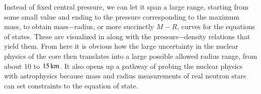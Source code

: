 Instead of fixed central pressure, we can let it span a large range, starting from some small value and ending to the pressure corresponding to the maximum mass, to obtain mass$-$radius, or more succinctly $M-R$, curves for the equations of states.
These are visualized in  along with the pressure$-$density relations that yield them.
From here it is obvious how the large uncertainty in the nuclear physics of the core then translates into a large possible allowed radius range, from about $10$ to $15\, \mathrm{km}$.
It also opens up a pathway of probing the nuclear physics with astrophysics because  mass and radius measurements of real neutron stars can set constraints to the equation of state.




